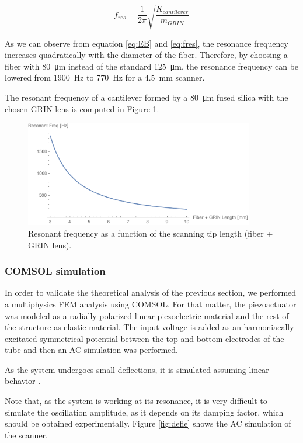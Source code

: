 \begin{equation}
f_{res} = \frac{1}{2 \pi} \sqrt{\frac{K_{cantilever}}{m_{\mathit{GRIN}}}} 
\label{eq:fres}
\end{equation}

As we can observe from equation \ref{eq:EB} and \ref{eq:fres}, the resonance frequency increases quadratically with the diameter of the fiber. Therefore, by choosing a fiber with \SI{80}{\micro\meter} instead of the standard \SI{125}{\micro\meter}, the resonance frequency can be lowered from \SI{1900}{\hertz} to \SI{770}{\hertz} for a \SI{4.5}{\milli\meter} scanner.

The resonant frequency of a cantilever formed by a \SI{80}{\micro\meter} fused silica with the chosen GRIN lens is computed in Figure \ref{fig:freq}.

\begin{figure}[h!]\centering
      \includegraphics[width=10cm]{figures/30_DesignSimulation/Mechanical/fres.pdf}
      \caption{Resonant frequency as a function of the scanning tip length (fiber + GRIN lens).}
      \label{fig:freq}
\end{figure}

\subsubsection{COMSOL simulation}
In order to validate the theoretical analysis of the previous section, we performed a multiphysics FEM analysis using COMSOL. For that matter, the piezoactuator was modeled as a radially polarized linear piezoelectric material and the rest of the structure as elastic material. The input voltage is added as an harmoniacally excitated symmetrical potential between the top and bottom electrodes of the tube and then an AC simulation was performed. 

As the system undergoes small deflections, it is simulated assuming linear behavior \cite{Fertis2006}.

Note that, as the system is working at its resonance, it is very difficult to simulate the oscillation amplitude, as it depends on its damping factor, which should be obtained experimentally. Figure \ref{fig:defle} shows the AC simulation of the scanner.

